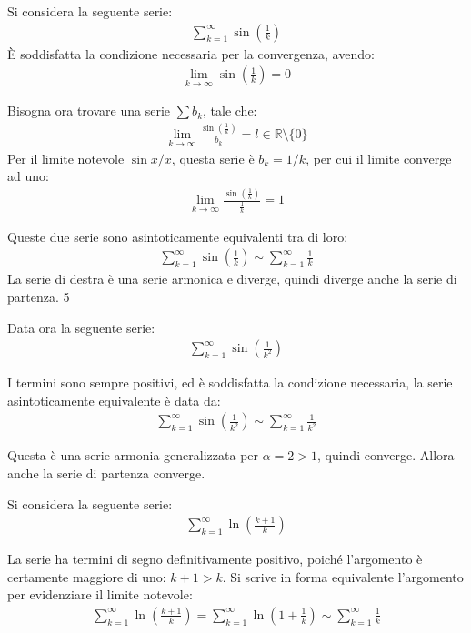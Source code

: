 \documentclass{article}
\numberwithin{equation}{subsection}
\begin{document}
Si considera la seguente serie:
\begin{gather*}
    \displaystyle\sum_{k=1}^\infty\sin\left(\frac{1}{k}\right)
\end{gather*}
È soddisfatta la condizione necessaria per la convergenza, avendo:
\begin{gather*}
    \displaystyle\lim_{k\to\infty}\sin\left(\frac{1}{k}\right)=0
\end{gather*}

Bisogna ora trovare una serie $\sum b_k$, tale che:
\begin{gather*}
    \displaystyle\lim_{k\to\infty}\frac{\sin\left(\frac{1}{k}\right)}{b_k}=l\in\mathbb{R}\setminus\{0\}
\end{gather*}
Per il limite notevole $\sin x/x$, questa serie è $b_k=1/k$, per cui il limite converge ad uno:
\begin{gather*}
    \displaystyle\lim_{k\to\infty}\frac{\sin\left(\frac{1}{k}\right)}{\frac{1}{k}}=1
\end{gather*}

Queste due serie sono asintoticamente equivalenti tra di loro:
\begin{gather*}
    \displaystyle\sum_{k=1}^\infty\sin\left(\frac{1}{k}\right)\sim\sum_{k=1}^\infty\frac{1}{k}
\end{gather*}
La serie di destra è una serie armonica e diverge, quindi diverge anche la serie di partenza. 5

Data ora la seguente serie:
\begin{gather*}
    \displaystyle\sum_{k=1}^\infty\sin\left(\frac{1}{k^2}\right)
\end{gather*}

I termini sono sempre positivi, ed è soddisfatta la condizione necessaria, la serie asintoticamente equivalente è data da:
\begin{gather*}
    \displaystyle\sum_{k=1}^\infty\sin\left(\frac{1}{k^2}\right)\sim\displaystyle\sum_{k=1}^\infty\frac{1}{k^2}
\end{gather*}

Questa è una serie armonia generalizzata per $\alpha=2>1$, quindi converge. Allora anche la serie di partenza converge.  


Si considera la seguente serie:
\begin{gather*}
    \displaystyle\sum_{k=1}^\infty\ln\left(\frac{k+1}{k}\right)
\end{gather*}

La serie ha termini di segno definitivamente positivo, poiché l'argomento è certamente maggiore di uno: $k+1>k$. Si scrive in forma equivalente l'argomento per evidenziare il limite notevole:
\begin{gather*}
    \displaystyle\sum_{k=1}^\infty\ln\left(\frac{k+1}{k}\right)=
    \displaystyle\sum_{k=1}^\infty\ln\left(1+\frac{1}{k}\right)\sim\sum_{k=1}^\infty\frac{1}{k}
\end{gather*}
\end{document}
